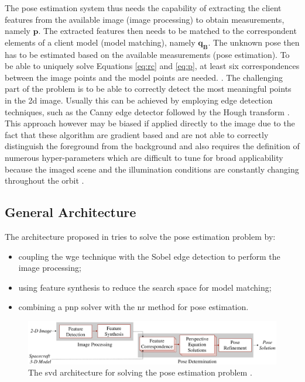 The pose estimation system thus needs the capability of extracting the client features from the available image (image processing) to obtain measurements, namely  $\mathbf{p}$. The extracted features then needs to be matched to the correspondent elements of a client model (model matching), namely $\mathbf{q_B}$. The unknown pose then has to be estimated based on the available measurements (pose estimation).
To be able to uniquely solve Equations \eqref{eq:rc} and \eqref{eq:p}, at least six correspondences between the image points and the model points are needed. \cite{10.1145/358669.358692}. The challenging part of the problem is to be able to correctly detect the most meaningful points in the \acrshort{2d} image. Usually this can be achieved by employing edge detection techniques, such as the Canny edge detector \cite{10.1109/TPAMI.1986.4767851} followed by the Hough transform \cite{10.1145/361237.361242}. This approach however may be biased if applied directly to the image due to the fact that these algorithm are gradient based and are not able to correctly distinguish the foreground from the background and also requires the definition of numerous hyper-parameters which are difficult to tune for broad applicability because the imaged scene and the illumination conditions are constantly changing throughout the orbit \cite{Sharma2018}.

\subsection{General Architecture}
The architecture proposed in \cite{Sharma2018} tries to solve the pose estimation problem by:

\begin{itemize}
  \item coupling the \acrfull{wge} technique with the Sobel edge detection to perform the image processing;
  \item using feature synthesis to reduce the search space for model matching;
  \item combining a \acrshort{pnp} solver with the \acrfull{nr} method for pose estimation.
\end{itemize}

\begin{figure}[htbp]
  \centering
  \includegraphics[width=1.0\textwidth]{gfx/SVDPipeline.eps}
  \caption{The \acrshort{svd} architecture for solving the pose estimation problem \cite{Sharma2018}.}
  \label{fig:svdArchitecture}
\end{figure}

